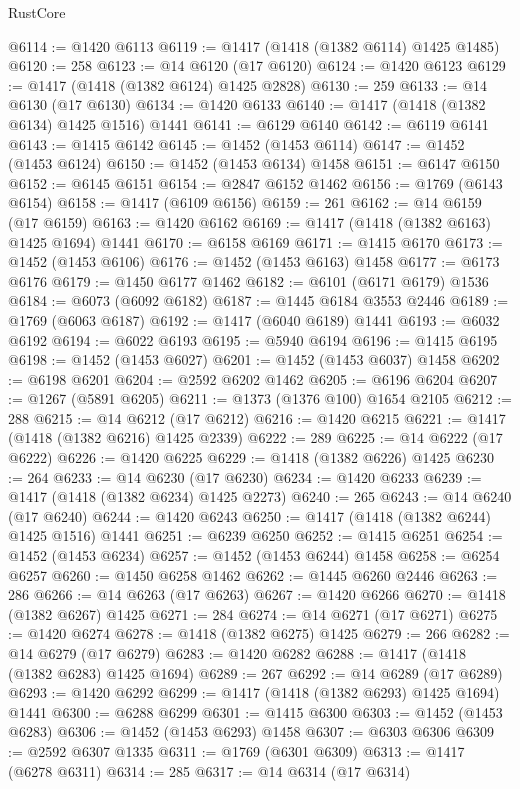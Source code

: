 \begin{lexlean}{RustCore}
\begin{coremodule}
@6114 := @1420 @6113
@6119 := @1417 (@1418 (@1382 @6114) @1425 @1485)
@6120 := 258
@6123 := @14 @6120 (@17 @6120)
@6124 := @1420 @6123
@6129 := @1417 (@1418 (@1382 @6124) @1425 @2828)
@6130 := 259
@6133 := @14 @6130 (@17 @6130)
@6134 := @1420 @6133
@6140 := @1417 (@1418 (@1382 @6134) @1425 @1516) @1441
@6141 := @6129 @6140
@6142 := @6119 @6141
@6143 := @1415 @6142
@6145 := @1452 (@1453 @6114)
@6147 := @1452 (@1453 @6124)
@6150 := @1452 (@1453 @6134) @1458
@6151 := @6147 @6150
@6152 := @6145 @6151
@6154 := @2847 @6152 @1462
@6156 := @1769 (@6143 @6154)
@6158 := @1417 (@6109 @6156)
@6159 := 261
@6162 := @14 @6159 (@17 @6159)
@6163 := @1420 @6162
@6169 := @1417 (@1418 (@1382 @6163) @1425 @1694) @1441
@6170 := @6158 @6169
@6171 := @1415 @6170
@6173 := @1452 (@1453 @6106)
@6176 := @1452 (@1453 @6163) @1458
@6177 := @6173 @6176
@6179 := @1450 @6177 @1462
@6182 := @6101 (@6171 @6179) @1536
@6184 := @6073 (@6092 @6182)
@6187 := @1445 @6184 @3553 @2446
@6189 := @1769 (@6063 @6187)
@6192 := @1417 (@6040 @6189) @1441
@6193 := @6032 @6192
@6194 := @6022 @6193
@6195 := @5940 @6194
@6196 := @1415 @6195
@6198 := @1452 (@1453 @6027)
@6201 := @1452 (@1453 @6037) @1458
@6202 := @6198 @6201
@6204 := @2592 @6202 @1462
@6205 := @6196 @6204
@6207 := @1267 (@5891 @6205)
@6211 := @1373 (@1376 @100) @1654 @2105
@6212 := 288
@6215 := @14 @6212 (@17 @6212)
@6216 := @1420 @6215
@6221 := @1417 (@1418 (@1382 @6216) @1425 @2339)
@6222 := 289
@6225 := @14 @6222 (@17 @6222)
@6226 := @1420 @6225
@6229 := @1418 (@1382 @6226) @1425
@6230 := 264
@6233 := @14 @6230 (@17 @6230)
@6234 := @1420 @6233
@6239 := @1417 (@1418 (@1382 @6234) @1425 @2273)
@6240 := 265
@6243 := @14 @6240 (@17 @6240)
@6244 := @1420 @6243
@6250 := @1417 (@1418 (@1382 @6244) @1425 @1516) @1441
@6251 := @6239 @6250
@6252 := @1415 @6251
@6254 := @1452 (@1453 @6234)
@6257 := @1452 (@1453 @6244) @1458
@6258 := @6254 @6257
@6260 := @1450 @6258 @1462
@6262 := @1445 @6260 @2446
@6263 := 286
@6266 := @14 @6263 (@17 @6263)
@6267 := @1420 @6266
@6270 := @1418 (@1382 @6267) @1425
@6271 := 284
@6274 := @14 @6271 (@17 @6271)
@6275 := @1420 @6274
@6278 := @1418 (@1382 @6275) @1425
@6279 := 266
@6282 := @14 @6279 (@17 @6279)
@6283 := @1420 @6282
@6288 := @1417 (@1418 (@1382 @6283) @1425 @1694)
@6289 := 267
@6292 := @14 @6289 (@17 @6289)
@6293 := @1420 @6292
@6299 := @1417 (@1418 (@1382 @6293) @1425 @1694) @1441
@6300 := @6288 @6299
@6301 := @1415 @6300
@6303 := @1452 (@1453 @6283)
@6306 := @1452 (@1453 @6293) @1458
@6307 := @6303 @6306
@6309 := @2592 @6307 @1335
@6311 := @1769 (@6301 @6309)
@6313 := @1417 (@6278 @6311)
@6314 := 285
@6317 := @14 @6314 (@17 @6314)

\end{coremodule}
\end{lexlean}
